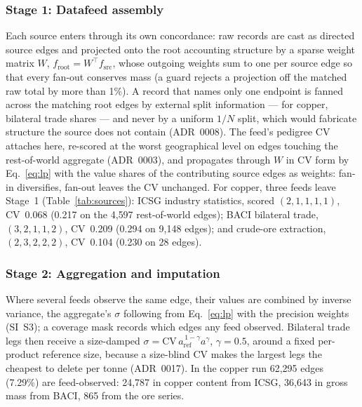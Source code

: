 \subsubsection{Stage 1: Datafeed assembly}\label{sec:stage1}

Each source enters through its own concordance: raw records are cast as
directed source edges and projected onto the root accounting structure by a
sparse weight matrix $W$, $f_{\mathrm{root}} = W^{\top} f_{\mathrm{src}}$,
whose outgoing weights sum to one per source edge so that every fan-out
conserves mass (a guard rejects a projection off the matched raw total by
more than 1\%). A record that names only one endpoint is fanned across the
matching root edges by external split information --- for copper, bilateral
trade shares --- and never by a uniform $1/N$ split, which would fabricate
structure the source does not contain (ADR~0008). The feed's pedigree CV
attaches here, re-scored at the worst geographical level on edges touching
the rest-of-world aggregate (ADR~0003), and propagates through $W$ in CV form
by Eq.~\eqref{eq:lp} with the value shares of the contributing source edges
as weights: fan-in diversifies, fan-out leaves the CV unchanged. For copper,
three feeds leave Stage~1 (Table~\ref{tab:sources}): ICSG industry
statistics, scored $(2,1,1,1,1)$, CV~0.068 (0.217 on the 4{,}597
rest-of-world edges); BACI bilateral trade, $(3,2,1,1,2)$, CV~0.209 (0.294
on 9{,}148 edges); and crude-ore extraction, $(2,3,2,2,2)$, CV~0.104 (0.230
on 28 edges).

\subsubsection{Stage 2: Aggregation and imputation}\label{sec:stage2}

Where several feeds observe the same edge, their values are combined by
inverse variance, the aggregate's $\sigma$ following from Eq.~\eqref{eq:lp}
with the precision weights (SI~S3); a coverage mask records which edges any
feed observed. Bilateral trade legs then receive a size-damped $\sigma =
\mathrm{CV}\, a_{\mathrm{ref}}^{\,1-\gamma} a^{\gamma}$, $\gamma = 0.5$,
around a fixed per-product reference size, because a size-blind CV makes the
largest legs the cheapest to delete per tonne (ADR~0017). In the copper run
62{,}295 edges (7.29\%) are feed-observed: 24{,}787 in copper content from
ICSG, 36{,}643 in gross mass from BACI, 865 from the ore series.

